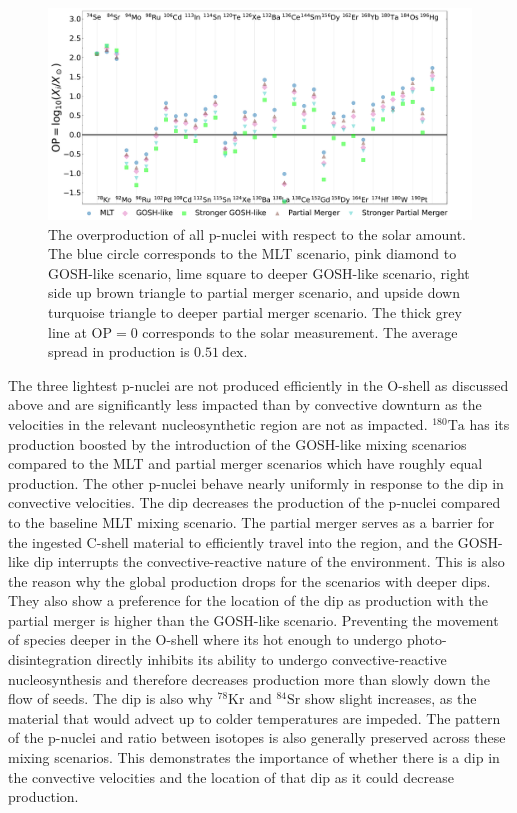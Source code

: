 \begin{figure}[!htbp]
\includegraphics[width=\textwidth]{chapters/2/figures/impact_mixing_GOSH_partial.pdf}
\caption{The overproduction of all p-nuclei with respect to the solar amount. The blue circle corresponds to the MLT scenario, pink diamond to GOSH-like scenario, lime square to deeper GOSH-like scenario, right side up brown triangle to partial merger scenario, and upside down turquoise triangle to deeper partial merger scenario. The thick grey line at $\mathrm{OP} = 0$ corresponds to the solar measurement. The average spread in production is $0.51~\mathrm{dex}$.
\label{fig:impactmixingcases_GOSH_partial}}
\end{figure}

The three lightest p-nuclei are not produced efficiently in the O-shell as discussed above and are significantly less impacted than by convective downturn as the velocities in the relevant nucleosynthetic region are not as impacted.
$^{180}\mathrm{Ta}$ has its production boosted by the introduction of the GOSH-like mixing scenarios compared to the MLT and partial merger scenarios which have roughly equal production.
The other p-nuclei behave nearly uniformly in response to the dip in convective velocities.
The dip decreases the production of the p-nuclei compared to the baseline MLT mixing scenario. 
The partial merger serves as a barrier for the ingested C-shell material to efficiently travel into the region, and the GOSH-like dip interrupts the convective-reactive nature of the environment.
This is also the reason why the global production drops for the scenarios with deeper dips. 
They also show a preference for the location of the dip as production with the partial merger is higher than the GOSH-like scenario.
Preventing the movement of species deeper in the O-shell where its hot enough to undergo photo-disintegration directly inhibits its ability to undergo convective-reactive nucleosynthesis and therefore decreases production more than slowly down the flow of seeds.
The dip is also why $^{78}\mathrm{Kr}$ and $^{84}\mathrm{Sr}$ show slight increases, as the material that would advect up to colder temperatures are impeded.
The pattern of the p-nuclei and ratio between isotopes is also generally preserved across these mixing scenarios.
This demonstrates the importance of whether there is a dip in the convective velocities and the location of that dip as it could decrease production.

